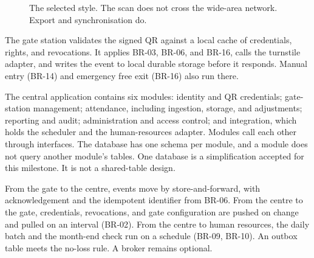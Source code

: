 \begin{figure}[ht]
\centering
{}
\caption{The selected style. The scan does not cross the wide-area network. Export and synchronisation do.}
\label{fig:style}
\end{figure}

The gate station validates the signed QR against a local cache of credentials, rights, and revocations.
It applies BR-03, BR-06, and BR-16, calls the turnstile adapter, and writes the event to local durable storage before it responds.
Manual entry (BR-14) and emergency free exit (BR-16) also run there.

The central application contains six modules: identity and QR credentials; gate-station management; attendance, including ingestion, storage, and adjustments; reporting and audit; administration and access control; and integration, which holds the scheduler and the human-resources adapter.
Modules call each other through interfaces.
The database has one schema per module, and a module does not query another module's tables.
One database is a simplification accepted for this milestone.
It is not a shared-table design.

From the gate to the centre, events move by store-and-forward, with acknowledgement and the idempotent identifier from BR-06.
From the centre to the gate, credentials, revocations, and gate configuration are pushed on change and pulled on an interval (BR-02).
From the centre to human resources, the daily batch and the month-end check run on a schedule (BR-09, BR-10).
An outbox table meets the no-loss rule.
A broker remains optional.

